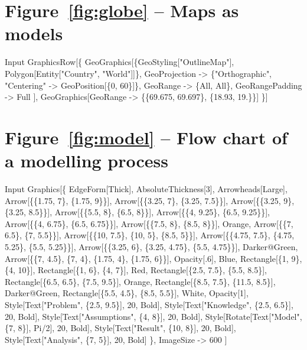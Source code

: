 \documentclass[11pt,fleqn]{book} %
\begin{document}
\section*{Figure~\ref{fig:globe} -- Maps as models }
\small{
\begin{mmaCell}[index=1]{Input}
  GraphicsRow[\{
    GeoGraphics[\{GeoStyling["OutlineMap"], Polygon[Entity["Country", "World"]]\}, 
      GeoProjection   -> \{"Orthographic", "Centering" -> GeoPosition[\{0, 60\}]\}, 
      GeoRange        -> \{All, All\}, 
      GeoRangePadding -> Full
    ],
    GeoGraphics[GeoRange -> \{\{69.675, 69.697\}, \{18.93, 19.\}\}]
  \}]
\end{mmaCell}
}

\section*{Figure~\ref{fig:model} -- Flow chart of a modelling process }
\small{
\begin{mmaCell}[index=1]{Input}
  Graphics[\{
    EdgeForm[Thick],
    AbsoluteThickness[3],
    Arrowheads[Large],
    Arrow[\{\{1.75, 7\}, \{1.75, 9\}\}],
    Arrow[\{\{3.25, 7\}, \{3.25, 7.5\}\}],
    Arrow[\{\{3.25, 9\}, \{3.25, 8.5\}\}],
    Arrow[\{\{5.5, 8\}, \{6.5, 8\}\}],
    Arrow[\{\{4, 9.25\}, \{6.5, 9.25\}\}],
    Arrow[\{\{4, 6.75\}, \{6.5, 6.75\}\}],
    Arrow[\{\{7.5, 8\}, \{8.5, 8\}\}],
    Orange,
    Arrow[\{\{7, 6.5\}, \{7, 5.5\}\}],
    Arrow[\{\{10, 7.5\}, \{10, 5\}, \{8.5, 5\}\}],
    Arrow[\{\{4.75, 7.5\}, \{4.75, 5.25\}, \{5.5, 5.25\}\}],
    Arrow[\{\{3.25, 6\}, \{3.25, 4.75\}, \{5.5, 4.75\}\}],
    Darker@Green,
    Arrow[\{\{7, 4.5\}, \{7, 4\}, \{1.75, 4\}, \{1.75, 6\}\}],
    Opacity[.6],
    Blue,
    Rectangle[\{1, 9\}, \{4, 10\}],
    Rectangle[\{1, 6\}, \{4, 7\}],
    Red,
    Rectangle[\{2.5, 7.5\}, \{5.5, 8.5\}],
    Rectangle[\{6.5, 6.5\}, \{7.5, 9.5\}],
    Orange,
    Rectangle[\{8.5, 7.5\}, \{11.5, 8.5\}],
    Darker@Green,
    Rectangle[\{5.5, 4.5\}, \{8.5, 5.5\}],
    White,
    Opacity[1],
    Style[Text["Problem", \{2.5, 9.5\}], 20, Bold],
    Style[Text["Knowledge", \{2.5, 6.5\}], 20, Bold],
    Style[Text["Assumptions", \{4, 8\}], 20, Bold],
    Style[Rotate[Text["Model", \{7, 8\}], Pi/2], 20, Bold],
    Style[Text["Result", \{10, 8\}], 20, Bold],
    Style[Text["Analysis", \{7, 5\}], 20, Bold]
    \}, 
    ImageSize -> 600
  ]
\end{mmaCell}
}
\end{document}

